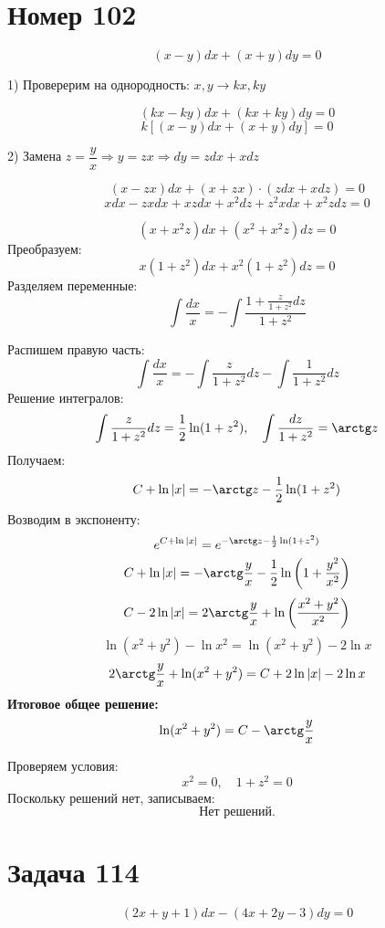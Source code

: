 \section*{Номер 102}

$$ (x - y) dx + (x + y) dy = 0 $$

\begin{solution}
    1) Проверерим на однородность: $x, y \rightarrow kx, ky$ \par
    $$ (kx - ky) dx + (kx + ky) dy = 0 $$
    $$ k[(x - y) dx + (x + y) dy] = 0 $$

    2) Замена $z = \dfrac{y}{x} \Rightarrow y = zx \Rightarrow dy = zdx + xdz$ \par
    $$ (x - zx) dx + (x + zx) \cdot (zdx + xdz) = 0 $$
    $$ xdx - zxdx + xzdx + x^2 dz + z^2 xdx + x^2 zdz = 0 $$

    $$ (x + x^2 z) dx + (x^2 + x^2 z) dz = 0 $$  
    Преобразуем:  
    $$ x(1 + z^2) dx + x^2(1 + z^2) dz = 0 $$  
    Разделяем переменные:  
    $$ \int \frac{dx}{x} = - \int \frac{1 + \frac{z}{1 + z^2} dz}{1 + z^2} $$  
    
    Распишем правую часть:  
    $$ \int \frac{dx}{x} = - \int \frac{z}{1 + z^2} dz - \int \frac{1}{1 + z^2} dz $$  
    Решение интегралов:  
    $$ \int \frac{z}{1 + z^2} dz = \frac{1}{2} \ln(1 + z^2), \quad \int \frac{dz}{1 + z^2} = \arctg z $$  
    Получаем:  
    $$ C + \ln |x| = -\arctg z - \frac{1}{2} \ln(1 + z^2) $$  
    Возводим в экспоненту:  
    $$ e^{C + \ln |x|} = e^{-\arctg z - \frac{1}{2} \ln(1 + z^2)} $$  
    $$ C + \ln |x| = -\arctg \frac{y}{x} - \frac{1}{2} \ln \left( 1 + \frac{y^2}{x^2} \right) $$  
    $$ C - 2 \ln |x| = 2 \arctg \frac{y}{x} + \ln \left( \frac{x^2 + y^2}{x^2} \right) $$  
    $$ \ln (x^2 + y^2) - \ln x^2 = \ln (x^2 + y^2) - 2 \ln x $$  
    $$ 2 \arctg \frac{y}{x} + \ln (x^2 + y^2) = C + 2 \ln |x| - 2 \ln x $$  
    \textbf{Итоговое общее решение: } 
    $$ \ln (x^2 + y^2) = C - \arctg \frac{y}{x} $$  
    
    Проверяем условия:  
    $$ x^2 = 0, \quad 1 + z^2 = 0 $$  
    Поскольку решений нет, записываем:  
    $$ \text{Нет решений.} $$
\end{solution}

\section*{Задача 114}
$$ (2x + y + 1)dx - (4x + 2y - 3) dy = 0 $$

